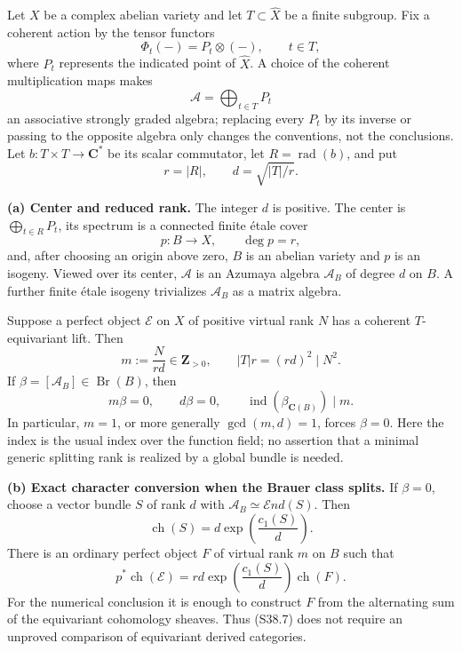 \begin{theorem}
\label{thm:semireg-residual-tensor-rank}
Let \(X\) be a complex abelian variety and let \(T\subset\widehat X\) be a finite subgroup. Fix a coherent action by the tensor functors \[
 \Phi_t(-)=P_t\otimes(-),\qquad t\in T,
\] where \(P_t\) represents the indicated point of \(\widehat X\). A choice of the coherent multiplication maps makes \[
 \mathscr A=\bigoplus_{t\in T}P_t
 \tag{S38.1}
\] an associative strongly graded algebra; replacing every \(P_t\) by its inverse or passing to the opposite algebra only changes the conventions, not the conclusions. Let \(b:T\times T\to\mathbf C^*\) be its scalar commutator, let \(R=\operatorname{rad}(b)\), and put \[
 r=|R|,\qquad d=\sqrt{|T|/r}.
 \tag{S38.2}
\]

\textbf{(a) Center and reduced rank.} The integer \(d\) is positive. The center is \(\bigoplus_{t\in R}P_t\), its spectrum is a connected finite étale cover \[
 p:B\longrightarrow X,\qquad\deg p=r,
 \tag{S38.3}
\] and, after choosing an origin above zero, \(B\) is an abelian variety and \(p\) is an isogeny. Viewed over its center, \(\mathscr A\) is an Azumaya algebra \(\mathscr A_B\) of degree \(d\) on \(B\). A further finite étale isogeny trivializes \(\mathscr A_B\) as a matrix algebra.

Suppose a perfect object \(\mathcal E\) on \(X\) of positive virtual rank \(N\) has a coherent \(T\)-equivariant lift. Then \[
 m:=\frac{N}{rd}\in\mathbf Z_{>0},\qquad
 |T|r=(rd)^2\mid N^2.
 \tag{S38.4}
\] If \(\beta=[\mathscr A_B]\in\operatorname{Br}(B)\), then \[
 m\beta=0,\qquad d\beta=0,
 \qquad\operatorname{ind}(\beta_{\mathbf C(B)})\mid m.
 \tag{S38.5}
\] In particular, \(m=1\), or more generally \(\gcd(m,d)=1\), forces \(\beta=0\). Here the index is the usual index over the function field; no assertion that a minimal generic splitting rank is realized by a global bundle is needed.

\textbf{(b) Exact character conversion when the Brauer class splits.} If \(\beta=0\), choose a vector bundle \(S\) of rank \(d\) with \(\mathscr A_B\simeq\mathcal End(S)\). Then \[
 \operatorname{ch}(S)=d\exp\!\left(\frac{c_1(S)}d\right).
 \tag{S38.6}
\] There is an ordinary perfect object \(F\) of virtual rank \(m\) on \(B\) such that \[
 p^*\operatorname{ch}(\mathcal E)
       =rd\exp\!\left(\frac{c_1(S)}d\right)\operatorname{ch}(F).
 \tag{S38.7}
\] For the numerical conclusion it is enough to construct \(F\) from the alternating sum of the equivariant cohomology sheaves. Thus (S38.7) does not require an unproved comparison of equivariant derived categories.


\end{theorem}
